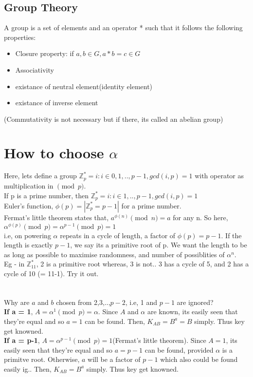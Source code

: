 \documentclass[english, 11pt]{article}
\begin{document}
\subsection*{Group Theory}
A group is a set of elements and an operator * such that it follows the following properties:
\begin{itemize}
  \item Closure property: if $a,b \in G, a * b = c \in G$
  \item Associativity
  \item existance of neutral element(identity element)
  \item existance of inverse element
\end{itemize}
(Commutativity is not necessary but if there, its called an abelian group)

\section*{How to choose $\alpha$}
Here, lets define a group $\mathbb{Z}^{*}_{p} = {i: i \in {0,1,..,p-1}, gcd(i,p) = 1}$ with operator as multiplication in $\pmod{p}$.\\
If p is a prime number, then $\mathbb{Z}^{*}_{p} = {i: i \in {1,..,p-1}, gcd(i,p) = 1}$ \\
Euler's function, $\phi(p) = |\mathbb{Z}^{*}_{p} = p-1|$ for a prime number. \\
Fermat's little theorem states that, $a^{\phi(n)} \pmod{n} = a$ for any n. So here,
$\alpha^{\phi(p)} \pmod{p} = \alpha^{p-1} \pmod{p} = 1$ \\
i.e, on powering $\alpha$ repeats in a cycle of length, a factor of $\phi(p) = p-1$.
If the length is exactly $p-1$, we say its a primitive root of p.
We want the length to be as long as possible to maximise randomness, and number of possiblities of $\alpha^n$.\\
Eg - in $\mathbb{Z}^{*}_{11}$, 2 is a primitive root whereas, 3 is not.. 3 has a cycle of 5, and 2 has a cycle of 10 (= 11-1). Try it out.
\\ \\ \\
Why are $a$ and $b$ chosen from {2,3,..,$p-2$}, i.e, 1 and $p-1$ are ignored?\\
\textbf{If a = 1}, $A = \alpha^1 \pmod{p} = \alpha$. Since $A$ and $\alpha$ are known, its easily seen that they're equal and so $a=1$ can be found. Then, $K_{AB} = B^a = B$ simply. Thus key get knowned.\\
\textbf{If a = p-1}, $A = \alpha^{p-1} \pmod{p} = 1$(Fermat's little theorem). Since $A=1$, its easily seen that they're equal and so $a=p-1$ can be found, provided $\alpha$ is a primitve root. Otherwise, $a$ will be a factor of $p-1$ which also could be found easily ig.. Then, $K_{AB} = B^a$ simply. Thus key get knowned.\\
\end{document}

